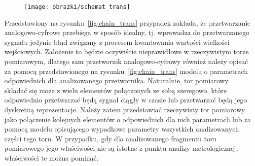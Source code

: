 \begin{figure}[htb!]
\begin{center}
\texttt{[image: obrazki/schemat\_trans]}
\end{center}
\end{figure}

Przedstawiony na rysunku~\ref{fig:chain_trans} przypadek zakłada, że przetwarzanie analogowo-cyfrowe przebiega w sposób idealny, tj. wprowadza do przetwarzanego sygnału jedynie błąd związany z procesem kwantowania wartości wielkości wejściowych. Założenie to będzie oczywiście nieprawidłowe w rzeczywistym torze pomiarowym, dlatego sam przetwornik analogowo-cyfrowy również należy opisać za pomocą przedstawionego na rysunku~\ref{fig:chain_trans} modelu o parametrach odpowiednich dla analizowanego przetwornika. Naturalnie, tor pomiarowy składać się może z wielu elementów połączonych ze sobą szeregowo, które odpowiednio przetwarzać będą sygnał ciągły w czasie lub przetwarzać będą jego dyskretną reprezentacje. Należy zatem przedstawiać rzeczywisty tor pomiarowy jako połączenie kolejnych elementów o odpowiednich dla nich parametrach lub za pomocą modelu opisującego wypadkowe parametry wszystkich analizowanych części tego toru. W przypadku, gdy dla analizowanego fragmentu toru pomiarowego jego właściwości nie są istotne z punktu analizy metrologicznej, właściwości te można pominąć.

